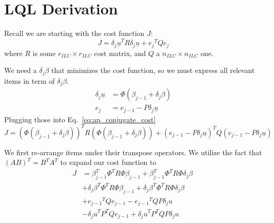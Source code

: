 \section{LQL Derivation}
\label{sec:lql_derivation}
Recall we are starting with the cost function $J$:
\begin{equation}
    J = {\delta_j \underline{u}}^T R {\delta_j \underline{u}} + {e_j}^T Q {e_j}
    \label{eq:ap_conjugate_cost}
\end{equation}
where $R$ is some $r_{ILC} \times r_{ILC}$ cost matrix, and $Q$ a $n_{ILC} \times n_{ILC}$ one.

We need a $\delta_j \beta$ that minimizes the cost function, so we must express all relevant items in term of $\delta_j \beta$.
\begin{equation}
    \begin{split}
        \delta_j \underline{u} &= \Phi(\beta_{j-1} + \delta_j \beta) \\
        e_j &= e_{j-1} - P \delta_j \underline{u}
    \end{split}
\end{equation}
Plugging those into Eq.~\ref{eq:ap_conjugate_cost}
\begin{equation}
    J = {\left(\Phi(\beta_{j-1} + \delta_j \beta)\right)}^T R {\left(\Phi(\beta_{j-1} + \delta_j \beta)\right)} + {\left(e_{j-1} - P \delta_j \underline{u}\right)}^T Q {\left(e_{j-1} - P \delta_j \underline{u}\right)}
\end{equation}

We first re-arrange items under their transpose operators. We utilize the fact that $(AB)^T = B^TA^T$ to expand our cost function to
\begin{equation}
    \begin{split}
        J &= {\beta_{j-1}^T}\Phi^T R \Phi \beta_{j-1} + {\beta_{j-1}^T}\Phi^T R \Phi \delta_j \beta \\
        &+ {\delta_j \beta}^T \Phi^T R \Phi \beta_{j-1} + {\delta_j \beta}^T \Phi^T R \Phi \delta_j \beta \\
        &+ {e_{j-1}}^T Q e_{j-1} - {e_{j-1}}^T Q P \delta_j u \\
        &- {\delta_j u}^T P^T Q e_{j-1} + {\delta_j u}^T P^T Q P \delta_j u
    \end{split}
~\label{eq:ap_expanded_cost}
\end{equation}


